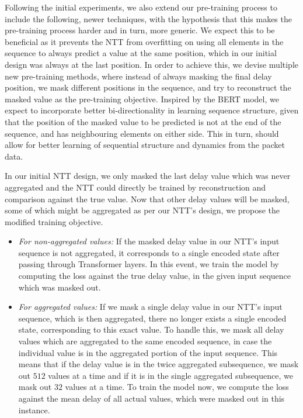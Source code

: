 Following the initial experiments, we also extend our pre-training process to include the following, newer techniques, with the hypothesis that this makes the pre-training process harder and in turn, more generic. We expect this to be beneficial as it prevents the NTT from overfitting on using all elements in the sequence to always predict a value at the same position, which in our initial design was always at the last position. In order to achieve this, we devise multiple new pre-training methods, where instead of always masking the final delay position, we mask different positions in the sequence, and try to reconstruct the masked value as the pre-training objective. Inspired by the BERT\cite{devlinBERTPretrainingDeep2019} model, we expect to incorporate better bi-directionality in learning sequence structure, given that the position of the masked value to be predicted is not at the end of the sequence, and has neighbouring elements on either side. This in turn, should allow for better learning of sequential structure and dynamics from the packet data.

In our initial NTT design, we only masked the last delay value which was never aggregated and the NTT could directly be trained by reconstruction and comparison against the true value. Now that other delay values will be masked, some of which might be aggregated as per our NTT's design, we propose the modified training objective.

\begin{itemize}
\item \emph{For non-aggregated values:} If the masked delay value in our NTT's input sequence is not aggregated, it corresponds to a single encoded state after passing through Transformer layers. In this event, we train the model by computing the loss against the true delay value, in the given input sequence which was masked out.
\item \emph{For aggregated values:} If we mask a single delay value in our NTT's input sequence, which is then aggregated, there no longer exists a single encoded state, corresponding to this exact value. To handle this, we mask all delay values which are aggregated to the same encoded sequence, in case the individual value is in the aggregated portion of the input sequence. This means that if the delay value is in the twice aggregated subsequence, we mask out $512$ values at a time and if it is in the single aggregated subsequence, we mask out $32$ values at a time. To train the model now, we compute the loss against the mean delay of all actual values, which were masked out in this instance.
\end{itemize}

